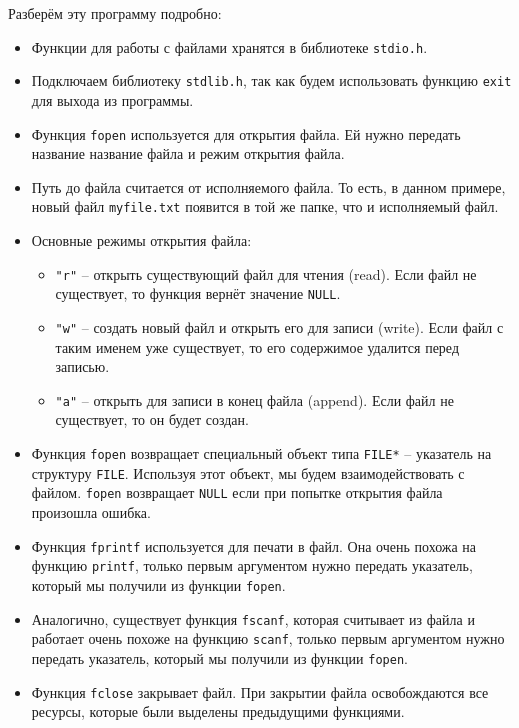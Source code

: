 \documentclass{article}
\begin{document}
Разберём эту программу подробно:

\begin{itemize}
\item Функции для работы с файлами хранятся в библиотеке \texttt{stdio.h}.
\item Подключаем библиотеку \texttt{stdlib.h}, так как будем использовать функцию \texttt{exit} для выхода из программы.
\item Функция \texttt{fopen} используется для открытия файла. Ей нужно передать название название файла и режим открытия файла.
\item Путь до файла считается от исполняемого файла. То есть, в данном примере, новый файл \texttt{myfile.txt} появится в той же папке, что и исполняемый файл.
\item Основные режимы открытия файла: 
\begin{itemize}
\item  \texttt{"r"} -- открыть существующий файл для чтения (read). Если файл не существует, то функция вернёт значение \texttt{NULL}.
\item \texttt{"w"} -- создать новый файл и открыть его для записи (write). Если файл с таким именем уже существует, то его содержимое удалится перед записью.
\item \texttt{"a"} -- открыть для записи в конец файла (append). Если файл не существует, то он будет создан.
\end{itemize}

\item Функция \texttt{fopen} возвращает специальный объект типа \texttt{FILE*} -- указатель на структуру \texttt{FILE}. Используя этот объект, мы будем взаимодействовать с файлом. \texttt{fopen} возвращает \texttt{NULL} если при попытке открытия файла произошла ошибка.

\item Функция \texttt{fprintf} используется для печати в файл. Она очень похожа на функцию \texttt{printf}, только первым аргументом нужно передать указатель, который мы получили из функции \texttt{fopen}.

\item Аналогично, существует функция \texttt{fscanf}, которая считывает из файла и работает очень похоже на функцию \texttt{scanf}, только первым аргументом нужно передать указатель, который мы получили из функции \texttt{fopen}.

\item Функция \texttt{fclose} закрывает файл. При закрытии файла освобождаются все ресурсы, которые были выделены предыдущими функциями.
\end{itemize}
\end{document}
